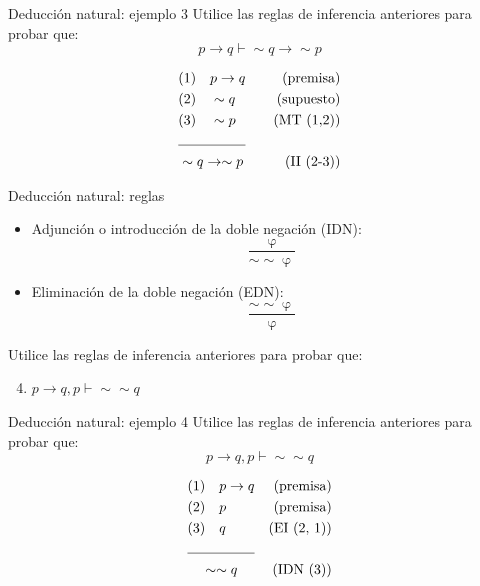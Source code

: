 \documentclass{beamer}
\begin{document}
\begin{frame}{Deducción natural: ejemplo 3}
  Utilice las reglas de inferencia anteriores para probar que:
  $$p \rightarrow q \vdash \sim q \rightarrow \sim p$$

  \begin{align*}
    &(1) \quad p \rightarrow q  & \quad (\text{premisa}) \\
    &(2) \quad \sim q  & \quad (\text{supuesto}) \\
    &(3) \quad \sim p  & \quad (\text{MT (1,2)}) \\
    \cline{1-2}
    &\sim q \rightarrow \sim p & \quad (\text{II (2-3)})
  \end{align*}

\end{frame}


\begin{frame}{Deducción natural: reglas}
  \begin{itemize}
    \item Adjunción o introducción de la doble negación (IDN):
    $$\dfrac{\upvarphi}{\sim \sim \upvarphi}$$

    \item Eliminación de la doble negación (EDN):
    $$\dfrac{\sim \sim \upvarphi}{\upvarphi}$$
  \end{itemize}

  Utilice las reglas de inferencia anteriores para probar que:
  \begin{enumerate}
    \setcounter{enumi}{3}
    \item $p \rightarrow q, p \vdash \sim \sim q$
  \end{enumerate}
\end{frame}


\begin{frame}{Deducción natural: ejemplo 4}
  Utilice las reglas de inferencia anteriores para probar que:
  $$p \rightarrow q, p \vdash \sim \sim q$$

  \begin{align*}
    &(1) \quad p \rightarrow q &\text{(premisa)}\\
    &(2) \quad p &\text{(premisa)}\\
    &(3) \quad q &\text{(EI (2, 1))}\\
    \cline{1-2}
    &\quad \sim \sim q &\text{(IDN (3))}
  \end{align*}
\end{frame}
\end{document}
